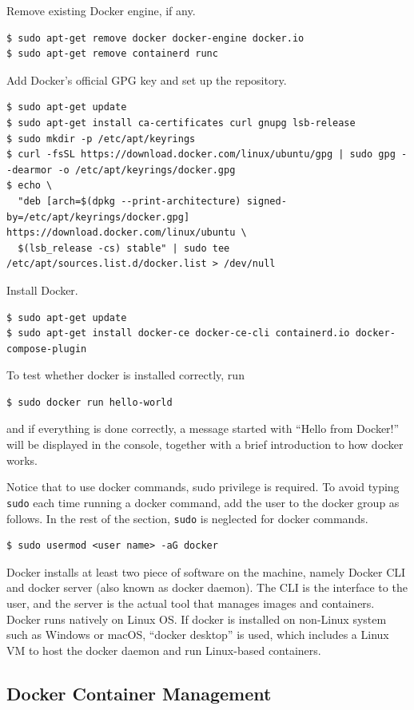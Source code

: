 Remove existing Docker engine, if any.
\begin{lstlisting}
$ sudo apt-get remove docker docker-engine docker.io
$ sudo apt-get remove containerd runc
\end{lstlisting}
Add Docker's official GPG key and set up the repository.
\begin{lstlisting}
$ sudo apt-get update
$ sudo apt-get install ca-certificates curl gnupg lsb-release
$ sudo mkdir -p /etc/apt/keyrings
$ curl -fsSL https://download.docker.com/linux/ubuntu/gpg | sudo gpg --dearmor -o /etc/apt/keyrings/docker.gpg
$ echo \
  "deb [arch=$(dpkg --print-architecture) signed-by=/etc/apt/keyrings/docker.gpg] https://download.docker.com/linux/ubuntu \
  $(lsb_release -cs) stable" | sudo tee /etc/apt/sources.list.d/docker.list > /dev/null
\end{lstlisting}
Install Docker.
\begin{lstlisting}
$ sudo apt-get update
$ sudo apt-get install docker-ce docker-ce-cli containerd.io docker-compose-plugin
\end{lstlisting}
To test whether docker is installed correctly, run
\begin{lstlisting}
$ sudo docker run hello-world
\end{lstlisting}
and if everything is done correctly, a message started with ``Hello from Docker!'' will be displayed in the console, together with a brief introduction to how docker works.

Notice that to use docker commands, sudo privilege is required. To avoid typing \verb|sudo| each time running a docker command, add the user to the docker group as follows. In the rest of the section, \verb|sudo| is neglected for docker commands.
\begin{lstlisting}
$ sudo usermod <user name> -aG docker
\end{lstlisting}

Docker installs at least two piece of software on the machine, namely Docker CLI and docker server (also known as docker daemon). The CLI is the interface to the user, and the server is the actual tool that manages images and containers. Docker runs natively on Linux OS. If docker is installed on non-Linux system such as Windows or macOS, ``docker desktop'' is used, which includes a Linux VM to host the docker daemon and run Linux-based containers.

\subsection{Docker Container Management}

